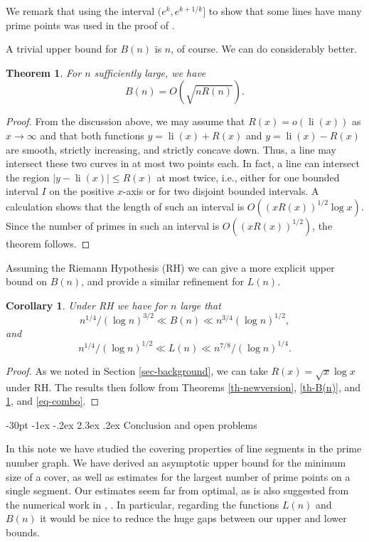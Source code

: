\documentclass[10pt]{article}
\makeatletter
\renewcommand\section{\@startsection {section}{1}{\z@}
{-30pt \@plus -1ex \@minus -.2ex}
{2.3ex \@plus.2ex}
{\normalfont\normalsize\bfseries\boldmath}}
\newtheorem{theorem}{Theorem}
\newtheorem{corollary}{Corollary}
\theoremstyle{definition}
\theoremstyle{remark}
\numberwithin{equation}{section}
\DeclareMathOperator{\li}{li}
\makeatother
\begin{document}
We remark that using the interval $(e^k,e^{k+1/k}]$ to show that some lines have many
prime points was used in the proof of \cite[Theorem 4.1]{P}.

A trivial upper bound for $B(n)$ is $n$, of course.  We can do considerably better.
\begin{theorem}
\label{th-Bbound}
For $n$ sufficiently large, we have
\[
B(n)=O(\sqrt{nR(n)}).
\]
\end{theorem}
\begin{proof}
 From the discussion above, we may assume that $R(x)=o(\li(x))$ as $x\to\infty$ and that
 both functions $y=\li(x)+R(x)$ and $y=\li(x)-R(x)$ are smooth, strictly increasing, and strictly 
 concave down.
 Thus, a line may intersect these two curves in at most two points each.  In fact, a line can
 intersect the region $|y-\li(x)|\le R(x)$ at most twice, i.e., either for one bounded interval $I$
 on the positive $x$-axis or for two disjoint bounded intervals.  A calculation shows that the
 length of such an  interval is $O((xR(x))^{1/2}\log x)$.   Since the number of primes in such
 an interval is $O((xR(x))^{1/2})$, the theorem follows.
 \end{proof}

Assuming the Riemann Hypothesis (RH) we can give a more explicit upper bound on $B(n)$, and provide a similar refinement for $L(n)$.

\begin{corollary} 
 \label{cor-RH}
Under RH we have for $n$  large that
\[
n^{1/4}/(\log n )^{3/2} \ll B(n)\ll n^{3/4}(\log n )^{1/2},
\]
and 
\[
n^{1/4}/(\log n)^{1/2}\ll L(n)\ll n^{7/8}/(\log n)^{1/4}.
\]
\end{corollary}
\begin{proof}
 As we noted in Section \ref{sec-background}, we can take 
 $R(x)=\sqrt{x} \log x$ under RH. The results then follow from Theorems \ref{th-newversion},
\ref{th-B(n)}, and \ref{th-Bbound},  and \eqref{eq-combo}.
\end{proof}

\section{Conclusion and open problems}\label{sec-conclusion}

In this note we have studied the covering properties of line segments in the prime number graph. We have derived an asymptotic upper bound for the minimum size of a cover, as well as estimates for the largest number of prime points on a single segment.  Our estimates seem far from optimal, as is also suggested
from the numerical work in \cite{O1}, \cite{O2}. 
In particular, regarding the functions $L(n)$ and $B(n)$ it would be nice to reduce the huge gaps between
our upper and lower bounds.
\end{document}
